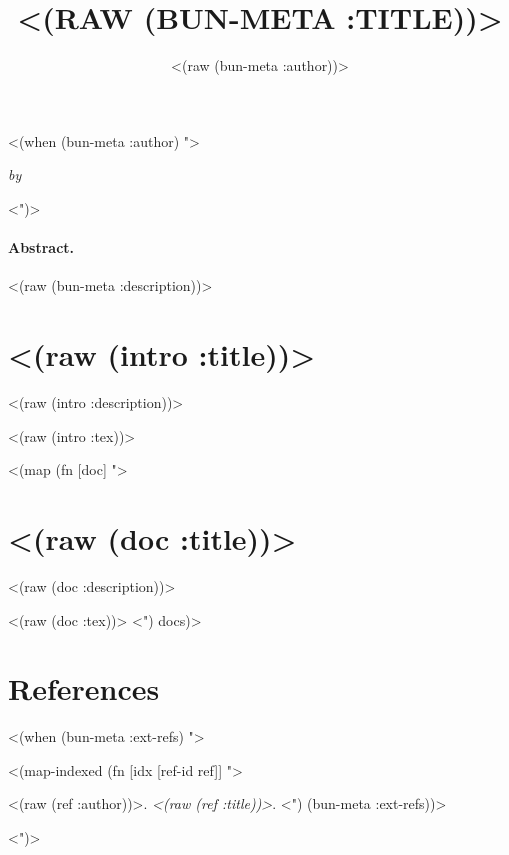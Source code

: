 \documentclass[a4paper,10pt]{article}
\author{<(raw (bun-meta :author))>}
\title{\uppercase{<(raw (bun-meta :title))>}}
\makeatletter
\def\maketitle{%
  \thispagestyle{empty}%
  \vskip 1cm
  \begin{center}
    \Large \strut \@title \par
  \end{center}
  \par
  <(when (bun-meta :author) ">
  \begin{center}
    \emph{by } \normalfont\@author\par
  \end{center}
  <")>
  }
\makeatother
\begin{document}
\maketitle

\paragraph{Abstract.}
<(raw (bun-meta :description))>

\section*{<(raw (intro :title))>}

<(raw (intro :description))>

<(raw (intro :tex))>

<(map (fn [doc] ">
\section{<(raw (doc :title))>}

<(raw (doc :description))>

<(raw (doc :tex))>
<") docs)>

\section*{References}

<(when (bun-meta :ext-refs) ">
\begin{description}[leftmargin=3cm,style=nextline]
<(map-indexed
 (fn [idx [ref-id ref]] ">
\item[<(raw ref-id)>] <(raw (ref :author))>. \emph{<(raw (ref :title))>}.
<") (bun-meta :ext-refs))>
\end{description}
<")>
\end{document}
